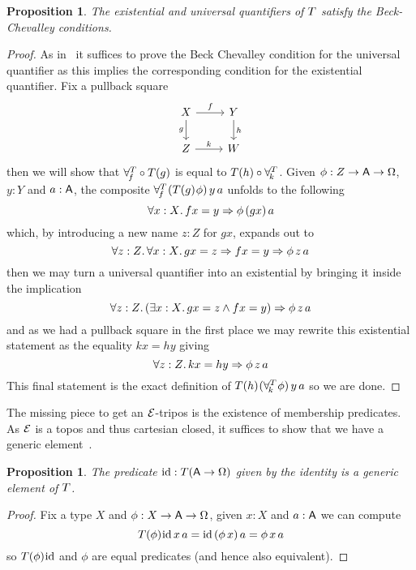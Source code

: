 \documentclass[11pt]{article}
\newtheorem{prop}[thrm]{Proposition}
\begin{document}
\begin{prop}
  The existential and universal quantifiers of \(T\) satisfy the
  Beck-Chevalley conditions.
\end{prop}
\begin{proof}
  As in~\cite{oostenRealizabilityIntroductionIts2008} it suffices to prove the
  Beck Chevalley condition for the universal quantifier as this implies
  the corresponding condition for the existential quantifier.
  Fix a pullback square
  \[\begin{tikzcd}
      X \arrow[r , "f"] \arrow[d, "g"'] & Y \arrow[d, "h"]\\
      Z \arrow[r , "k"] & W
    \end{tikzcd}\]
  then we will show that \(\forall^{T}_{\!{f}}\circ T{(}{g})\) is
  equal to \(T{(}{h})\circ\forall^{T}_{\!{k}}\).
  Given \(\phi : {{Z}\to{{{\ensuremath{\mathsf{A}}}\to{\Omega}}}}\), \(y:Y\) and \(a:\mathsf{A}\), the composite
  \(\forall^{T}_{\!{f}}\mspace{1mu}{(T{(}{g})\mspace{1mu}{\phi})}\,y\,a\) unfolds to the following
  \[
    \forall{x:X}.\,{{fx=y}\Rightarrow{\phi\,(gx)\,a}}
  \]
  which, by introducing a new name \(z:Z\) for \(gx\), expands out to
  \[
    \forall{z:Z}.\,{\forall{x:X}.\,{{gx=z}\Rightarrow{{fx=y}\Rightarrow{\phi\,z\,a}}}}
  \]
  then we may turn a universal quantifier into an existential by bringing
  it inside the implication
  \[
    \forall{z:Z}.\,{{(\exists{x:X}.\,{{gx=z}\land{fx=y}})}\Rightarrow{\phi\,z\,a}}
  \]
  and as we had a pullback square in the first place we may rewrite this
  existential statement as the equality \(kx=hy\) giving
  \[
    \forall{z:Z}.\,{{kx=hy}\Rightarrow{\phi\,z\,a}}
  \]
  This final statement is the exact definition of
  \(T{(}{h})\mspace{1mu}{(\forall^{T}_{\!{k}}\mspace{1mu}{\phi})}\,y\,a\) so we are done.
\end{proof}

The missing piece to get an \(\mathcal{E}\)-tripos is the existence of membership
predicates.
%
As \(\mathcal{E}\) is a topos and thus cartesian closed, it suffices to show that we have
a generic element~\cite[pg. 52]{oostenRealizabilityIntroductionIts2008}.

\begin{prop}
  The predicate \(\text{id}:T{({{\mathsf{A}}\to{\Omega}})}\) given by the identity is a
  generic element of \(T\).
\end{prop}
\begin{proof}
  Fix a type \(X\) and \(\phi : {{X}\to{{{\ensuremath{\mathsf{A}}}\to{\Omega}}}}\), given \(x:X\) and \(a:\mathsf{A}\) we
  can compute
  \[
    T{(}{\phi})\mspace{1mu}{\text{id}}\,x\,a=\text{id}\,(\phi\,x)\,a=\phi\,x\,a
  \]
  so \(T{(}{\phi})\mspace{1mu}{\text{id}}\) and \(\phi\) are equal predicates (and
  hence also equivalent).
\end{proof}
\end{document}

